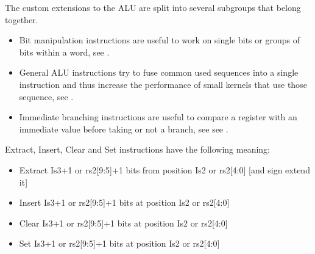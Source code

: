 \documentclass[letterpaper,10pt,english]{sphinxmanual}
\begin{document}
\sphinxAtStartPar
The custom extensions to the ALU are split into several subgroups that belong
together.
\begin{itemize}
\item {} 
\sphinxAtStartPar
Bit manipulation instructions are useful to work on single bits or
groups of bits within a word, see {\hyperref[\detokenize{instruction_set_extensions:corev-bit-manipulation}]{}}.

\item {} 
\sphinxAtStartPar
General ALU instructions try to fuse common used sequences into a
single instruction and thus increase the performance of small kernels
that use those sequence, see {\hyperref[\detokenize{instruction_set_extensions:corev-general-alu}]{}}.

\item {} 
\sphinxAtStartPar
Immediate branching instructions are useful to compare a register
with an immediate value before taking or not a branch, see see {\hyperref[\detokenize{instruction_set_extensions:corev-immediate-branching}]{}}.

\end{itemize}

\sphinxAtStartPar
Extract, Insert, Clear and Set instructions have the following meaning:
\begin{itemize}
\item {} 
\sphinxAtStartPar
Extract Is3+1 or rs2{[}9:5{]}+1 bits from position Is2 or rs2{[}4:0{]} {[}and sign extend it{]}

\item {} 
\sphinxAtStartPar
Insert Is3+1 or rs2{[}9:5{]}+1 bits at position Is2 or rs2{[}4:0{]}

\item {} 
\sphinxAtStartPar
Clear Is3+1 or rs2{[}9:5{]}+1 bits at position Is2 or rs2{[}4:0{]}

\item {} 
\sphinxAtStartPar
Set Is3+1 or rs2{[}9:5{]}+1 bits at position Is2 or rs2{[}4:0{]}

\end{itemize}
\end{document}
